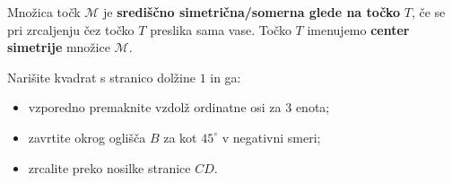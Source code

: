                 Množica točk $\mathcal{M}$ je \textbf{središčno simetrična/somerna glede na točko} $T$, 
                če se pri zrcaljenju čez točko $T$ preslika sama vase. 
                Točko $T$ imenujemo \textbf{center simetrije} množice $\mathcal{M}$. 




\newpage
        


        
            \begin{naloga}
                Narišite kvadrat s stranico dolžine $1$ in ga:
                \begin{itemize}
                    \item vzporedno premaknite vzdolž ordinatne osi za $3$ enota;
                    \item zavrtite okrog oglišča $B$ za kot $45^\circ$ v negativni smeri;
                    \item zrcalite preko nosilke stranice $CD$.
                \end{itemize}
            \end{naloga}

